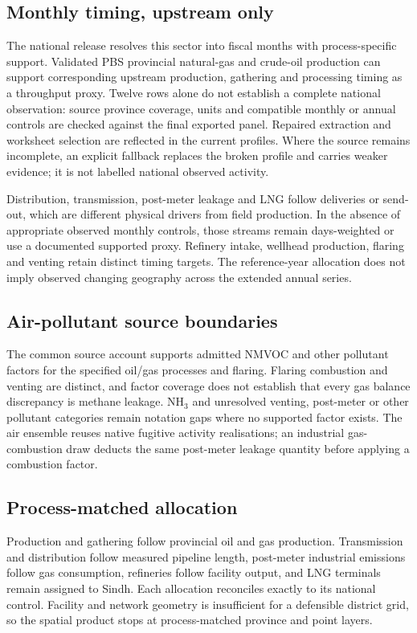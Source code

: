 \subsection{Monthly timing, upstream only}

The national release resolves this sector into fiscal months with process-specific support. Validated PBS provincial natural-gas and crude-oil production can support corresponding upstream production, gathering and processing timing as a throughput proxy. Twelve rows alone do not establish a complete national observation: source province coverage, units and compatible monthly or annual controls are checked against the final exported panel. Repaired extraction and worksheet selection are reflected in the current profiles. Where the source remains incomplete, an explicit fallback replaces the broken profile and carries weaker evidence; it is not labelled national observed activity.

Distribution, transmission, post-meter leakage and LNG follow deliveries or send-out, which are different physical drivers from field production. In the absence of appropriate observed monthly controls, those streams remain days-weighted or use a documented supported proxy. Refinery intake, wellhead production, flaring and venting retain distinct timing targets. The reference-year allocation does not imply observed changing geography across the extended annual series.

\subsection{Air-pollutant source boundaries}
The common source account supports admitted NMVOC and other pollutant factors for the specified oil/gas processes and flaring. Flaring combustion and venting are distinct, and factor coverage does not establish that every gas balance discrepancy is methane leakage. NH$_3$ and unresolved venting, post-meter or other pollutant categories remain notation gaps where no supported factor exists. The air ensemble reuses native fugitive activity realisations; an industrial gas-combustion draw deducts the same post-meter leakage quantity before applying a combustion factor.

\subsection{Process-matched allocation}

Production and gathering follow provincial oil and gas production. Transmission and
distribution follow measured pipeline length, post-meter industrial emissions follow gas
consumption, refineries follow facility output, and LNG terminals remain assigned to Sindh. Each
allocation reconciles exactly to its national control. Facility and network geometry is
insufficient for a defensible district grid, so the spatial product stops at process-matched
province and point layers.

